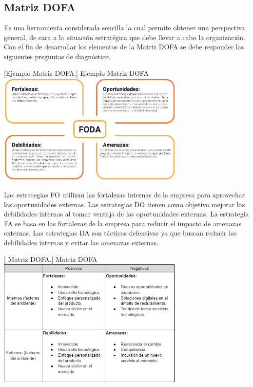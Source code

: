 \subsection{Matriz DOFA}
Es una herramienta considerada sencilla la cual permite obtener una perspectiva general, de cara a la situación estratégica que debe llevar a cabo la organización. \cite{talancón} Con el fin de desarrollar los elementos de la Matriz DOFA se debe responder las siguientes preguntas de diagnóstico.

\vspace{2mm}
\begin{minipage}{0.9\textwidth}
\centering
{}[{Ejemplo Matriz DOFA.}]{ Ejemplo Matriz DOFA }
\label{dofa}
\includegraphics[width=0.7\textwidth]{Images/FODA.jpg}
\end{minipage}

Las estrategias FO utilizan las fortalezas internas de la empresa para aprovechar las oportunidades externas. Las estrategias DO tienen como objetivo mejorar las debilidades internas al tomar ventaja de las oportunidades externas. La estrategia FA se basa en las fortalezas de la empresa para reducir el impacto de amenazas externas. Las estrategias DA son tácticas defensivas ya que buscan reducir las debilidades internas y evitar las amenazas externas.

\begin{minipage}{0.9\textwidth}
\centering
{}[{ Matriz DOFA.}]{  Matriz DOFA }
\label{dofa}
\includegraphics[width=0.7\textwidth]{Images/matrizDOFA.png}
\end{minipage}